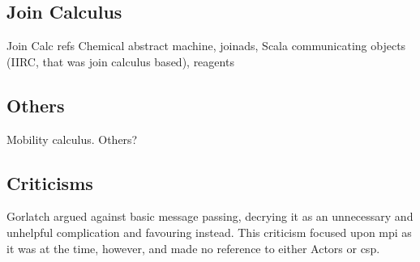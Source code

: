 \subsection{Join Calculus}

\begin{anfxwarning}{Join Calc refs}
Chemical abstract machine, joinads, Scala communicating objects (IIRC, that was join calculus based), reagents
\end{anfxwarning}

\subsection{Others}
Mobility calculus.  Others?

\subsection{Criticisms}

Gorlatch \cite{Gorlatch2004} argued against basic message passing, decrying it as an unnecessary and unhelpful complication and favouring  instead.  This criticism focused upon \gls{mpi} as it was at the time, however, and made no reference to either Actors or \gls{csp}. 
